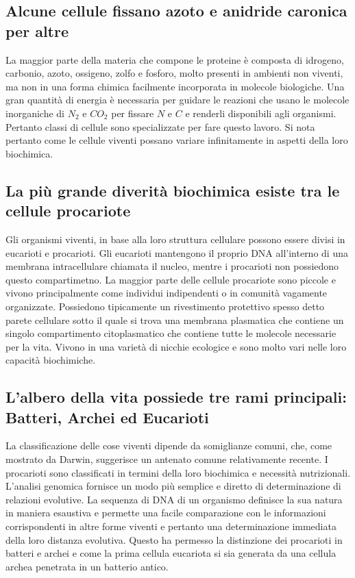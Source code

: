 \subsection{Alcune cellule fissano azoto e anidride caronica per altre}
La maggior parte della materia che compone le proteine \`e composta di idrogeno, carbonio, azoto, ossigeno, zolfo e fosforo, molto presenti in ambienti non viventi, ma non in una forma
chimica facilmente incorporata in molecole biologiche. Una gran quantit\`a di energia \`e necessaria per guidare le reazioni che usano le molecole inorganiche di $N_2$ e $CO_2$ per 
fissare $N$ e $C$ e renderli disponibili agli organismi. Pertanto classi di cellule sono specializzate per fare questo lavoro. Si nota pertanto come le cellule viventi possano variare 
infinitamente in aspetti della loro biochimica. 
\subsection{La pi\`u grande diverit\`a biochimica esiste tra le cellule procariote}
Gli organismi viventi, in base alla loro struttura cellulare possono essere divisi in eucarioti e procarioti. Gli eucarioti mantengono il proprio DNA all'interno di una membrana 
intracellulare chiamata il nucleo, mentre i procarioti non possiedono questo compartimetno. La maggior parte delle cellule procariote sono piccole e vivono principalmente come individui
indipendenti o in comunit\`a vagamente organizzate. Possiedono tipicamente un rivestimento protettivo spesso detto parete cellulare sotto il quale si trova una membrana plasmatica
che contiene un singolo compartimento citoplasmatico che contiene tutte le molecole necessarie per la vita. Vivono in una variet\`a di nicchie ecologice e sono molto vari nelle loro
capacit\`a biochimiche. 
\subsection{L'albero della vita possiede tre rami principali: Batteri, Archei ed Eucarioti}
La classificazione delle cose viventi dipende da somiglianze comuni, che, come mostrato da Darwin, suggerisce un antenato comune relativamente recente. I procarioti sono classificati in
termini della loro biochimica e necessit\`a nutrizionali. L'analisi genomica fornisce un modo pi\`u semplice e diretto di determinazione di relazioni evolutive. La sequenza di DNA di 
un organismo definisce la sua natura in maniera esaustiva e permette una facile comparazione con le informazioni corrispondenti in altre forme viventi e pertanto una determinazione 
immediata della loro distanza evolutiva. Questo ha permesso la distinzione dei procarioti in batteri e archei e come la prima cellula eucariota si sia generata da una cellula archea 
penetrata in un batterio antico. 
